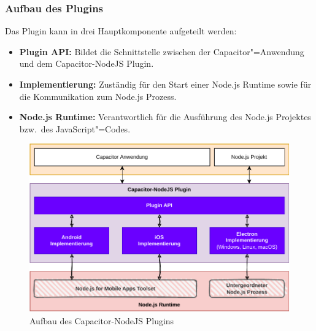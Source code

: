 \subsubsection{Aufbau des Plugins}

Das Plugin kann in drei Hauptkomponente aufgeteilt werden:

\begin{itemize}
  \item \textbf{Plugin API:} Bildet die Schnittstelle zwischen der Capacitor"=Anwendung und dem Capacitor-NodeJS Plugin.
  \item \textbf{Implementierung:} Zuständig für den Start einer Node.js Runtime sowie für die Kommunikation zum Node.js Prozess.
  \item \textbf{Node.js Runtime:} Verantwortlich für die Ausführung des Node.js Projektes bzw.\ des JavaScript"=Codes.
\end{itemize}

\vfill

\begin{figure}[H]
  \centering
  \includegraphics[width=\textwidth]{assets/02_Capacitor-NodeJS/02_Aufbau.drawio.pdf}
  \caption[Capacitor-NodeJS / Aufbau]{Aufbau des Capacitor-NodeJS Plugins}
\end{figure}

\vfill
